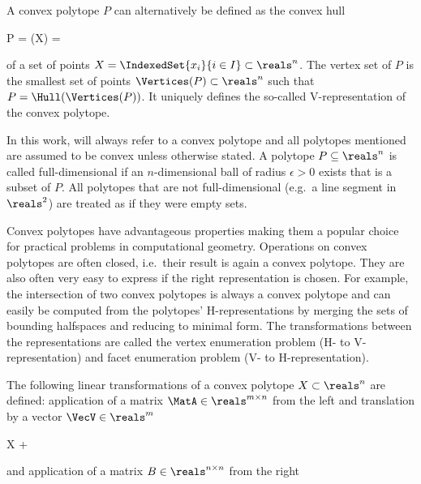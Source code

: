     A convex polytope $P$ can alternatively be defined as the convex hull

    \startformula
        P = \Hull(X) = 
    \stopformula

    of a set of points $X = \IndexedSet{x_i}{i \in I} \subset \reals^n$.
    The vertex set of $P$ is the smallest set of points $\Vertices(P) \subset \reals^n$ such that $P = \Hull({\Vertices(P)})$.
    It uniquely defines the so-called V-representation of the convex polytope.

    In this work,  will always refer to a convex polytope and all polytopes mentioned are assumed to be convex unless otherwise stated.
    A polytope $P \subseteq \reals^n$ is called full-dimensional if an $n$-dimensional ball of radius $\epsilon > 0$ exists that is a subset of $P$.
    All polytopes that are not full-dimensional (e.g.\ a line segment in $\reals^2$) are treated as if they were empty sets.

\stopsubsection


\startsubsection[title={Operations on Convex Polytopes},reference=sec:theory-geometry-operations]

    Convex polytopes have advantageous properties making them a popular choice for practical problems in computational geometry.
    Operations on convex polytopes are often closed, i.e.\ their result is again a convex polytope.
    They are also often very easy to express if the right representation is chosen.
    For example, the intersection of two convex polytopes is always a convex polytope and can easily be computed from the polytopes' H-representations by merging the sets of bounding halfspaces and reducing to minimal form.
    The transformations between the representations are called the vertex enumeration problem (H- to V-representation) and facet enumeration problem (V- to H-representation).

    The following linear transformations of a convex polytope $X \subset \reals^n$ are defined:
    application of a matrix $\MatA \in \reals^{m \times n}$ from the left and translation by a vector $\VecV \in \reals^m$

    \startformula
        \MatA X + \VecV \colonequals {}
    \stopformula

    and application of a matrix $B \in \reals^{n \times n}$ from the right

